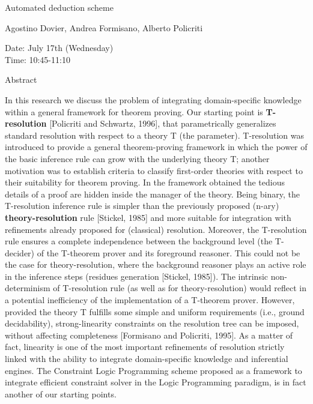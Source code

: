 \begin{center}
\LARGE
Automated deduction scheme 

\end{center}

\begin{center}
\Large
Agostino Dovier, Andrea Formisano, Alberto Policriti

\end{center}

\noindent
Date: July 17th (Wednesday)\\
Time:  10:45-11:10\\

\begin{center}
\large
Abstract
\end{center}

In this research we discuss the problem of integrating domain-specific
knowledge within a general framework for theorem proving. Our starting
point is {\bf T-resolution} [Policriti and Schwartz, 1996], that
parametrically generalizes standard resolution with respect to a
theory T (the parameter). T-resolution was introduced to provide a
general theorem-proving framework in which the power of the basic
inference rule can grow with the underlying theory T; another
motivation was to establish criteria to classify first-order theories
with respect to their suitability for theorem proving. In the
framework obtained the tedious details of a proof are hidden inside
the manager of the theory.  Being binary, the T-resolution inference
rule is simpler than the previously proposed (n-ary) {\bf theory-resolution}
rule [Stickel, 1985] and more suitable for integration with
refinements already proposed for (classical) resolution. Moreover, the
T-resolution rule ensures a complete independence between the
background level (the T-decider) of the T-theorem prover and its
foreground reasoner. This could not be the case for theory-resolution,
where the background reasoner plays an active role in the inference
steps (residues generation [Stickel, 1985]).  The intrinsic
non-determinism of T-resolution rule (as well as for
theory-resolution) would reflect in a potential inefficiency of the
implementation of a T-theorem prover. However, provided the theory T
fulfills some simple and uniform requirements (i.e., ground
decidability), strong-linearity constraints on the resolution tree can
be imposed, without affecting completeness [Formisano and Policriti,
1995].  As a matter of fact, linearity is one of the most important
refinements of resolution strictly linked with the ability to
integrate domain-specific knowledge and inferential engines. The
Constraint Logic Programming scheme proposed as a framework to
integrate efficient constraint solver in the Logic Programming
paradigm, is in fact another of our starting points.

